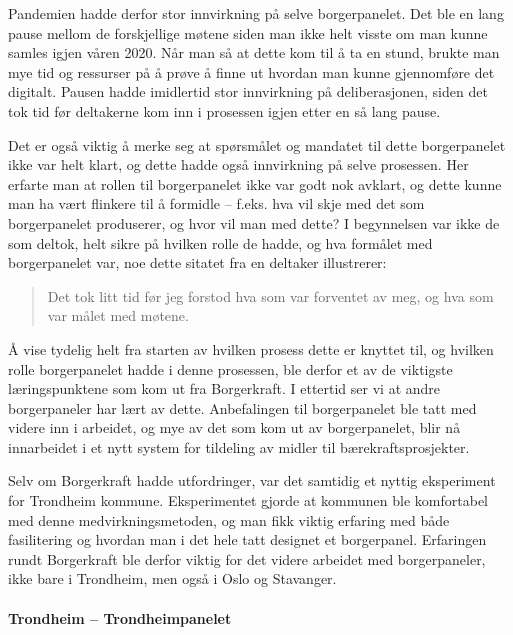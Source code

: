 \documentclass[
  12pt,
  a4paper, 12pt]{article}
\begin{document}
Pandemien hadde derfor stor innvirkning på selve borgerpanelet. Det ble en lang pause mellom de forskjellige møtene siden man ikke helt visste om man kunne samles igjen våren 2020. Når man så at dette kom til å ta en stund, brukte man mye tid og ressurser på å prøve å finne ut hvordan man kunne gjennomføre det digitalt. Pausen hadde imidlertid stor innvirkning på deliberasjonen, siden det tok tid før deltakerne kom inn i prosessen igjen etter en så lang pause.

Det er også viktig å merke seg at spørsmålet og mandatet til dette borgerpanelet ikke var helt klart, og dette hadde også innvirkning på selve prosessen. Her erfarte man at rollen til borgerpanelet ikke var godt nok avklart, og dette kunne man ha vært flinkere til å formidle -- f.eks. hva vil skje med det som borgerpanelet produserer, og hvor vil man med dette? I begynnelsen var ikke de som deltok, helt sikre på hvilken rolle de hadde, og hva formålet med borgerpanelet var, noe dette sitatet fra en deltaker illustrerer:

\begin{quote}
Det tok litt tid før jeg forstod hva som var forventet av meg, og hva som var målet med møtene.
\end{quote}

Å vise tydelig helt fra starten av hvilken prosess dette er knyttet til, og hvilken rolle borgerpanelet hadde i denne prosessen, ble derfor et av de viktigste læringspunktene som kom ut fra Borgerkraft. I ettertid ser vi at andre borgerpaneler har lært av dette.
Anbefalingen til borgerpanelet ble tatt med videre inn i arbeidet, og mye av det som kom ut av borgerpanelet, blir nå innarbeidet i et nytt system for tildeling av midler til bærekraftsprosjekter.

Selv om Borgerkraft hadde utfordringer, var det samtidig et nyttig eksperiment for Trondheim kommune. Eksperimentet gjorde at kommunen ble komfortabel med denne medvirkningsmetoden, og man fikk viktig erfaring med både fasilitering og hvordan man i det hele tatt designet et borgerpanel. Erfaringen rundt Borgerkraft ble derfor viktig for det videre arbeidet med borgerpaneler, ikke bare i Trondheim, men også i Oslo og Stavanger.

\hypertarget{trondheim-trondheimpanelet}{%
\paragraph{Trondheim -- Trondheimpanelet}\label{trondheim-trondheimpanelet}}
\end{document}
